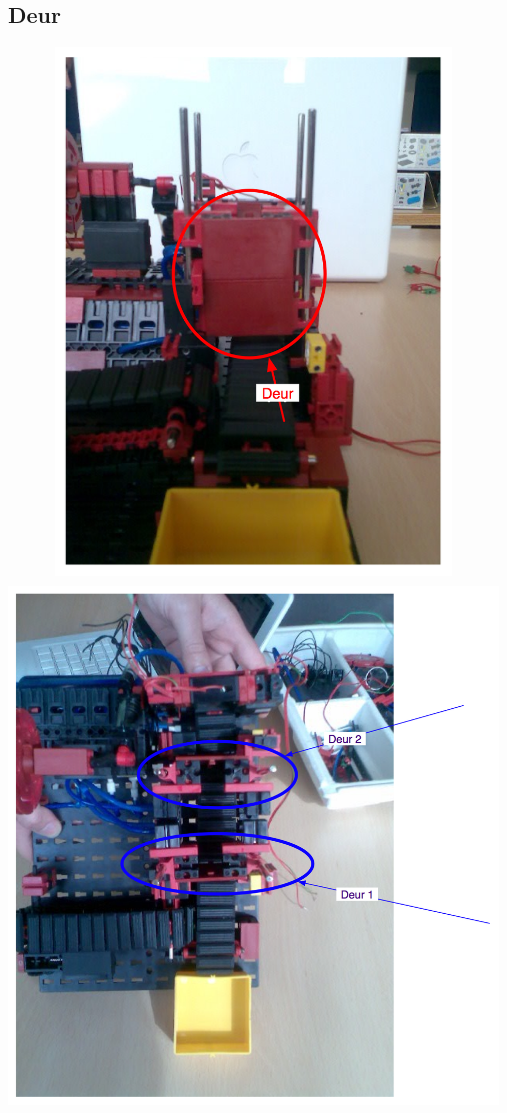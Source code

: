\subsection{Deur}\label{sub:deur} %
  \includegraphics[width=13cm, height=14cm]{deuren_voor} \\
  \includegraphics[width=13cm, height=14cm]{deuren} \\

